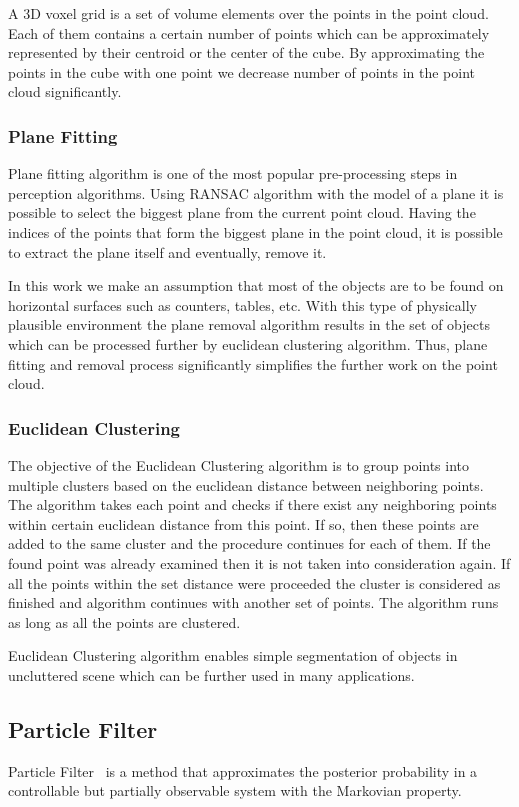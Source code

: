 A 3D voxel grid is a set of volume elements over the points in the point cloud. Each of them contains a certain number of points which can be approximately represented by their centroid or the center of the cube. By approximating the points in the cube with one point we decrease number of points in the point cloud significantly. 

\subsubsection{Plane Fitting}
Plane fitting algorithm is one of the most popular pre-processing steps in perception algorithms. Using RANSAC algorithm with the model of a plane it is possible to select the biggest plane from the current point cloud. Having the indices of the points that form the biggest plane in the point cloud, it is possible to extract the plane itself and eventually, remove it. 

In this work we make an assumption that most of the 
objects are to be found on horizontal surfaces such as counters, tables, etc. With this type of physically plausible environment the plane removal algorithm results in the set of objects which can be processed further by euclidean clustering algorithm. Thus, plane fitting and removal process significantly simplifies the further work on the point cloud.



\subsubsection{Euclidean Clustering}
The objective of the Euclidean Clustering algorithm is to group points into multiple clusters based on the euclidean distance between neighboring points. The algorithm takes each point and checks if there exist any neighboring points within certain euclidean distance from this point. If so, then these points are added to the same cluster and the procedure continues for each of them. If the found point was already examined then it is not taken into consideration again. If all the points within the set distance were proceeded the cluster is considered as finished and algorithm continues with another set of points. The algorithm runs as long as all the points are clustered. 

Euclidean Clustering algorithm enables simple segmentation of objects in uncluttered scene which can be further used in many applications.   

\subsection{Particle Filter}
Particle Filter~\cite{Thrun02d} is a method that approximates the posterior probability in a controllable but partially observable system with the Markovian property. 

